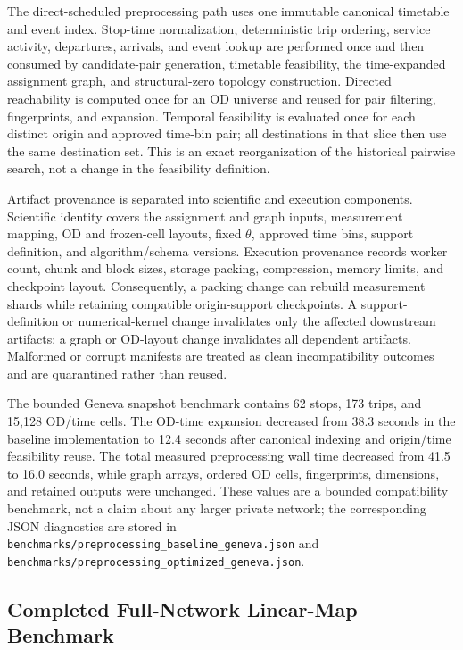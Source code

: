 The direct-scheduled preprocessing path uses one immutable canonical timetable
and event index.  Stop-time normalization, deterministic trip ordering,
service activity, departures, arrivals, and event lookup are performed once and
then consumed by candidate-pair generation, timetable feasibility, the
time-expanded assignment graph, and structural-zero topology construction.
Directed reachability is computed once for an OD universe and reused for pair
filtering, fingerprints, and expansion.  Temporal feasibility is evaluated
once for each distinct origin and approved time-bin pair; all destinations in
that slice then use the same destination set.  This is an exact reorganization
of the historical pairwise search, not a change in the feasibility definition.

Artifact provenance is separated into scientific and execution components.
Scientific identity covers the assignment and graph inputs, measurement
mapping, OD and frozen-cell layouts, fixed $\theta$, approved time bins,
support definition, and algorithm/schema versions.  Execution provenance
records worker count, chunk and block sizes, storage packing, compression,
memory limits, and checkpoint layout.  Consequently, a packing change can
rebuild measurement shards while retaining compatible origin-support
checkpoints.  A support-definition or numerical-kernel change invalidates only
the affected downstream artifacts; a graph or OD-layout change invalidates all
dependent artifacts.  Malformed or corrupt manifests are treated as clean
incompatibility outcomes and are quarantined rather than reused.

The bounded Geneva snapshot benchmark contains 62 stops, 173 trips, and
15,128 OD/time cells.  The OD-time expansion decreased from 38.3 seconds in the
baseline implementation to 12.4 seconds after canonical indexing and
origin/time feasibility reuse.  The total measured preprocessing wall time
decreased from 41.5 to 16.0 seconds, while graph arrays, ordered OD cells,
fingerprints, dimensions, and retained outputs were unchanged.  These values
are a bounded compatibility benchmark, not a claim about any larger private
network;
the corresponding JSON diagnostics are stored in
\texttt{benchmarks/preprocessing\_baseline\_geneva.json} and
\texttt{benchmarks/preprocessing\_optimized\_geneva.json}.

\subsection{Completed Full-Network Linear-Map Benchmark}

